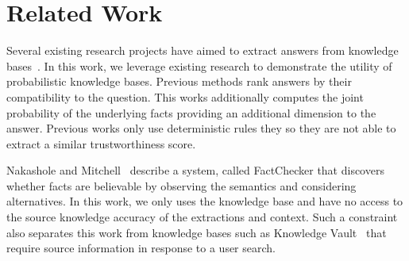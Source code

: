 

\section{Related Work}

Several existing research projects have aimed to extract answers from knowledge bases~\cite{yahya2012natural,yao2014information}.
In this work, we leverage existing research to demonstrate the utility of probabilistic knowledge bases.
Previous methods rank answers by their compatibility to the question.
This works additionally computes the joint probability of the underlying facts providing an additional dimension to the answer.
Previous works only use deterministic rules they so they are not able to extract a similar trustworthiness score.

Nakashole and Mitchell~\cite{nakashole2014languageaware} describe a system,
called FactChecker that discovers whether facts are believable by observing the
semantics and considering alternatives. 
In this work, we only uses the knowledge base and have no access to the source
knowledge accuracy of the extractions and context.
Such a constraint also separates this work from knowledge bases such as
Knowledge Vault~\cite{dong2014knowledge} that require source information in
response to a user search.


